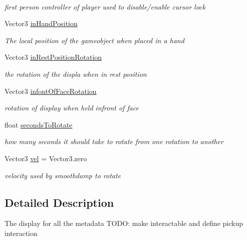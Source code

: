 \begin{DoxyCompactItemize}
$$\begin{DoxyCompactList}\small\item\em first person controller of player used to disable/enable cursor lock \end{DoxyCompactList}\item 
Vector3 \mbox{\hyperlink{class_meta_data_display_a4e34e1d8b9c75b14c8f6c855fb2111f1}{in\+Hand\+Position}}
\begin{DoxyCompactList}\small\item\em The local position of the gameobject when placed in a hand \end{DoxyCompactList}\item 
Vector3 \mbox{\hyperlink{class_meta_data_display_a9ef2490b62574ea0bab65606aec7dfa3}{in\+Rest\+Position\+Rotation}}
\begin{DoxyCompactList}\small\item\em the rotation of the displa when in rest position \end{DoxyCompactList}\item 
Vector3 \mbox{\hyperlink{class_meta_data_display_ae41331b0fbedf8bfd267c2b3a0adab1d}{infont\+Of\+Face\+Rotation}}
\begin{DoxyCompactList}\small\item\em rotation of display when held infront of face \end{DoxyCompactList}\item 
float \mbox{\hyperlink{class_meta_data_display_a612841c627976605dcf6e6463ae9263a}{seconds\+To\+Rotate}}
\begin{DoxyCompactList}\small\item\em how many seconds it should take to rotate from one rotation to another \end{DoxyCompactList}\item 
Vector3 \mbox{\hyperlink{class_meta_data_display_acf43e79c248b25fb43dcf3d997c25c59}{vel}} = Vector3.\+zero
\begin{DoxyCompactList}\small\item\em velocity used by smoothdamp to rotate \end{DoxyCompactList}\end{DoxyCompactItemize}


\subsection{Detailed Description}
The display for all the metadata T\+O\+DO\+: make interactable and define pickup interaction 




